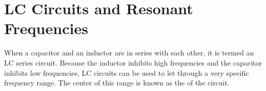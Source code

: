 \section{LC Circuits and Resonant Frequencies}

When a capacitor and an inductor are in series with each other, it is termed an LC series circuit.
Because the inductor inhibits high frequencies and the capacitor inhibits low frequencies, LC circuits can be used to let through a very specific frequency range.
The center of this range is known as the  of the circuit.




